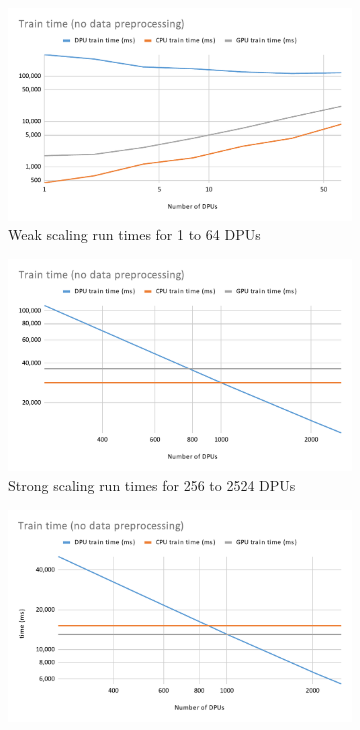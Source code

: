 \begin{figure}
    \begin{subfigure}{0.48\linewidth}
        \includegraphics[width=\linewidth]{figures/KMeansweak.pdf}
        \caption{Weak scaling run times for 1 to 64 DPUs}
        \label{fig:KMeansweak}
    \end{subfigure}\hfill
    \begin{subfigure}{0.48\linewidth}
        \includegraphics[width=\linewidth]{figures/KMeansstrong.pdf}
        \caption{Strong scaling run times for 256 to 2524 DPUs}
        \label{fig:KMeansstrong}
    \end{subfigure}\par\medskip
    \begin{subfigure}{0.48\linewidth}
        \includegraphics[width=\linewidth]{figures/KMeansHiggs.pdf}

\end{subfigure}
\end{figure}
